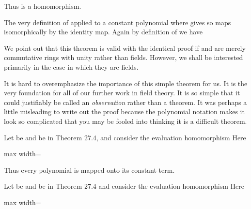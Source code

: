 \documentclass[11pt,oneside]{article}
\begin{document}
\begin{BookBody}
\noindent Thus \BookInline{\phi _{\alpha }} is a homomorphism.

The very definition of \BookInline{\phi _{\alpha }} applied to a constant polynomial  where  gives  so \BookInline{\phi _{\alpha }} maps  isomorphically by the identity map. Again by definition of \BookInline{\phi _{\alpha },\allowbreak } we have \BookEnd{\blacklozenge}

We point out that this theorem is valid with the identical proof if  and  are merely commutative rings with unity rather than fields. However, we shall be interested primarily in the case in which they are fields.

It is hard to overemphasize the importance of this simple theorem for us. It is the very foundation for all of our further work in field theory. It is so simple that it could justifiably be called an\textit{ observation} rather than a theorem. It was perhaps a little misleading to write out the proof because the polynomial notation makes it look so complicated that you may be fooled into thinking it is a difficult theorem.

 Let  be  and  be  in Theorem 27.4, and consider the evaluation homomorphism  Here

\begin{center}\begin{adjustbox}{max width=\linewidth}\end{adjustbox}\end{center}

\noindent Thus every polynomial is mapped onto its constant term. \BookEnd{\blacktriangle}

 Let  be  and  be  in Theorem 27.4 and consider the evaluation homomorphism  Here

\begin{center}\begin{adjustbox}{max width=\linewidth}\end{adjustbox}\end{center}


\end{BookBody}
\end{document}
